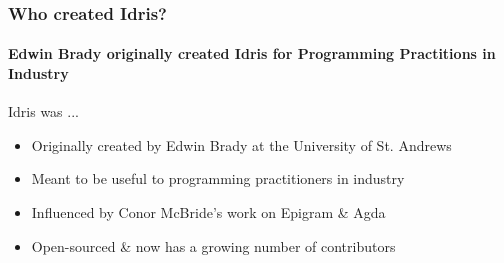 \begin{frame}[fragile]
\frametitle{Who created Idris?}
\framesubtitle{Edwin Brady originally created Idris for Programming Practitions in Industry}

Idris was ...

\begin{itemize}
  \item Originally created by Edwin Brady at the University of St. Andrews
  \item Meant to be useful to programming practitioners in industry
  \item Influenced by Conor McBride's work on Epigram \& Agda
  \item Open-sourced \& now has a growing number of contributors
\end{itemize}

\end{frame}
